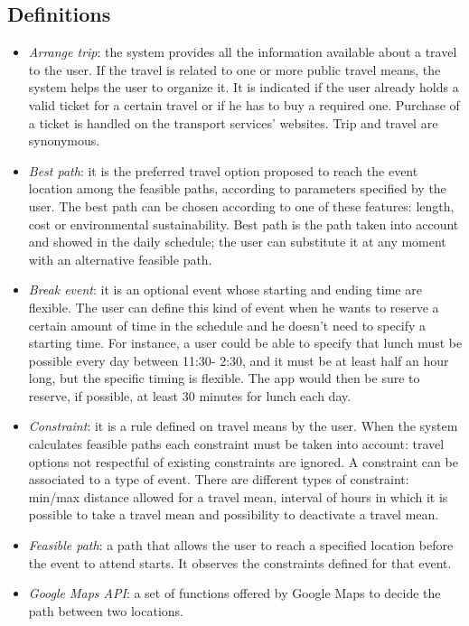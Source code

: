 \subsection{Definitions}
	\begin{itemize}
	\item \textit{Arrange trip}: the system provides all the information available about a travel to the user. If the travel is related to one or more public travel means, the system helps the user to organize it. It is indicated if the user already holds a valid ticket for a certain travel or if he has to buy a required one. Purchase of a ticket is handled on the transport services' websites. Trip and travel are synonymous.
	\item \textit{Best path}: it is the preferred travel option proposed to reach the event location among the feasible paths, according to parameters specified by the user. The best path can be chosen according to one of these features: length, cost or environmental sustainability. Best path is the path taken into account and showed in the daily schedule; the user can substitute it at any moment with an alternative feasible path. 
	\item \textit{Break event}: it is an optional event whose starting and ending time are flexible. The user can define this kind of event when he wants to reserve a certain amount of time in the schedule and he doesn't need to specify a starting time. For instance, a user could be able to specify that lunch must be possible every day between 11:30-
2:30, and it must be at least half an hour long, but the specific timing is flexible. The app would then be sure to reserve, if possible, at least 30 minutes for lunch each day.
	\item \textit{Constraint}: it is a rule defined on travel means by the user. When the system calculates feasible paths each constraint must be taken into account: travel options not respectful of existing constraints are ignored. A constraint can be associated to a type of event. There are different types of constraint: min/max distance allowed for a travel mean, interval of hours in which it is possible to take a travel mean and possibility to deactivate a travel mean. 
	\item \textit{Feasible path}: a path that allows the user to reach a specified location before the event to attend starts. It observes the constraints defined for that event.
	\item \textit{Google Maps API}: a set of functions offered by Google Maps to decide the path between two locations.

\end{itemize}

